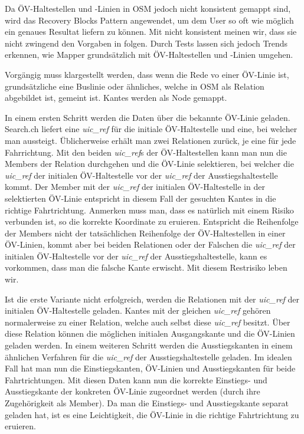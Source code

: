 Da ÖV-Haltestellen und -Linien in \ac{OSM} jedoch nicht konsistent gemappt sind, wird das Recovery Blocks Pattern \cite{fault_tolerant_software} angewendet, um dem User so oft wie möglich ein genaues Resultat liefern zu können. Mit nicht konsistent meinen wir, dass sie nicht zwingend den Vorgaben in \cite{osm_wiki_relation} folgen. Durch Tests lassen sich jedoch Trends erkennen, wie Mapper grundsätzlich mit ÖV-Haltestellen und -Linien umgehen.

Vorgängig muss klargestellt werden, dass wenn die Rede vo einer ÖV-Linie ist, grundsätzliche eine Buslinie oder ähnliches, welche in \ac{OSM} als Relation \cite{osm_wiki_relation} abgebildet ist, gemeint ist. \glspl{Kante} werden als Node gemappt.

In einem ersten Schritt werden die Daten über die bekannte ÖV-Linie geladen. Search.ch \cite{search_ch_route_api} liefert eine \emph{uic\_ref} für die initiale ÖV-Haltestelle und eine, bei welcher man aussteigt. Üblicherweise erhält man zwei Relationen zurück, je eine für jede Fahrrichtung. Mit den beiden \emph{uic\_ref}s der ÖV-Haltestellen kann man nun die Members der Relation durchgehen und die ÖV-Linie selektieren, bei welcher die \emph{uic\_ref} der initialen ÖV-Haltestelle vor der \emph{uic\_ref} der Ausstiegshaltestelle kommt. Der Member mit der \emph{uic\_ref} der initialen ÖV-Haltestelle in der selektierten ÖV-Linie entspricht in diesem Fall der gesuchten \glspl{Kante} in die richtige Fahrtrichtung.
Anmerken muss man, dass es natürlich mit einem Risiko verbunden ist, so die korrekte Koordinate zu eruieren. Entspricht die Reihenfolge der Members nicht der tatsächlichen Reihenfolge der ÖV-Haltestellen in einer ÖV-Linien, kommt aber bei beiden Relationen oder der Falschen die \emph{uic\_ref} der initialen ÖV-Haltestelle vor der \emph{uic\_ref} der Ausstiegshaltestelle, kann es vorkommen, dass man die falsche Kante erwischt. Mit diesem Restrisiko leben wir.

Ist die erste Variante nicht erfolgreich, werden die Relationen mit der \emph{uic\_ref} der initialen ÖV-Haltestelle geladen. \glspl{Kante} mit der gleichen \emph{uic\_ref} gehören normalerweise zu einer Relation, welche auch selbst diese \emph{uic\_ref} besitzt. Über diese Relation können die möglichen initialen Ausgangskante und die ÖV-Linien geladen werden. In einem weiteren Schritt werden die Ausstiegskanten in einem ähnlichen Verfahren für die \emph{uic\_ref} der Ausstiegshaltestelle geladen. Im idealen Fall hat man nun die Einstiegskanten, ÖV-Linien und Ausstiegskanten für beide Fahrtrichtungen. Mit diesen Daten kann nun die korrekte Einstiegs- und Ausstiegskante der konkreten ÖV-Linie zugeordnet werden (durch ihre Zugehörigkeit als Member). Da man die Einstiegs- und Ausstiegskante separat geladen hat, ist es eine Leichtigkeit, die ÖV-Linie in die richtige Fahrtrichtung zu eruieren.

